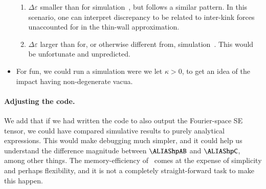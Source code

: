 \begin{itemize}
\begin{enumerate}
        \item $\Delta \varepsilon$ smaller than for simulation~, but follows a similar pattern. In this scenario, one can interpret discrepancy to be related to inter-kink forces unaccounted for in the thin-wall approximation.
        \item $\Delta \varepsilon$ larger than for, or otherwise different from, simulation~. This would be unfortunate and unpredicted.
    \end{enumerate}
    \item For fun, we could run a simulation were we let $\kappa>0$, to get an idea of the impact having non-degenerate vacua. 
\end{itemize}


\paragraph{Adjusting the code.} We add that if we had written the code to also output the Fourier-space SE tensor, we could have compared simulative results to purely analytical expressions. This would make debugging much simpler, and it could help us understand the difference magnitude between $\hpAB$ and $\hpC$, among other things. The memory-efficiency of~\gevolution{} comes at the expense of simplicity and perhaps flexibility, and it is not a completely straight-forward task to make this happen.



